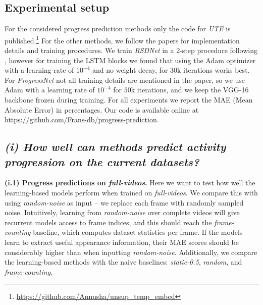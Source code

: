 \subsection{Experimental setup}
For the considered progress prediction methods only the code for \textsl{UTE} is published.\footnote{\url{https://github.com/Annusha/unsup_temp_embed}} 
For the other methods, we follow the papers for implementation details and training procedures. 
We train \textsl{RSDNet} in a 2-step procedure following \cite{twinanda2019}, however for training the LSTM blocks we found that using the Adam optimizer with a learning rate of $10^{-4}$ and no weight decay, for $30$k iterations works best. 
For \textsl{ProgressNet} not all training details are mentioned in the paper, so we use Adam with a learning rate of $10^{-4}$ for $50$k iterations, and we keep the VGG-16 backbone frozen during training. 
For all experiments we report the MAE (Mean Absolute Error) in percentages.
Our code is available online at \href{https://github.com/Frans-db/progress-prediction}{https://github.com/Frans-db/progress-prediction}.

\subsection{\textbf{\emph{(i) How well can methods predict activity progression on the current datasets?}}}
\noindent\textbf{(i.1) Progress predictions on \textsl{full-videos}.}
Here we want to test how well the learning-based models perform when trained on \textsl{full-videos}.
We compare this with using \textsl{random-noise} as input -- we replace each frame with randomly sampled noise. 
Intuitively, learning from \textsl{random-noise} over complete videos will give recurrent models access to frame indices, and this should reach the \textsl{frame-counting} baseline, which computes dataset statistics per frame.
If the models learn to extract useful appearance information, their MAE scores should be considerably higher than when inputting \textsl{random-noise}.
Additionally, we compare the learning-based methods with the naive baselines: \textsl{static-0.5}, \textsl{random}, and \textsl{frame-counting}.

